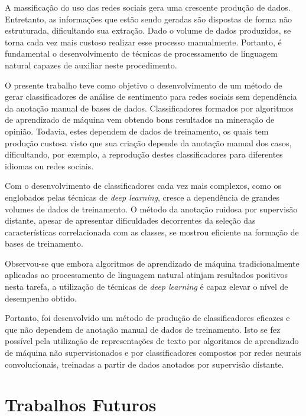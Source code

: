 A massificação do uso das redes sociais gera uma crescente produção de dados.
Entretanto, as informações que estão sendo geradas são dispostas de forma não estruturada, dificultando sua extração.
Dado o volume de dados produzidos, se torna cada vez mais custoso realizar esse processo manualmente.
Portanto, é fundamental o desenvolvimento de técnicas de processamento de linguagem natural capazes de auxiliar neste
procedimento.

O presente trabalho teve como objetivo o desenvolvimento de um método de gerar classificadores de análise de sentimento
para redes sociais sem dependência da anotação manual de bases de dados.
Classificadores formados por algoritmos de aprendizado de máquina vem obtendo bons resultados na mineração de opinião.
Todavia, estes dependem de dados de treinamento, os quais tem produção custosa visto que sua criação depende da anotação
manual dos casos, dificultando, por exemplo, a reprodução destes classificadores para diferentes idiomas ou redes
sociais.

Com o desenvolvimento de classificadores cada vez mais complexos, como os englobados pelas técnicas de
\textit{deep learning}, cresce a dependência de grandes volumes de dados de treinamento.
O método da anotação ruidosa por supervisão distante, apesar de apresentar dificuldades decorrentes da seleção das
características correlacionada com as classes, se mostrou eficiente na formação de bases de treinamento.

Observou-se que embora algoritmos de aprendizado de máquina tradicionalmente aplicadas ao processamento de linguagem
natural atinjam resultados positivos nesta tarefa, a utilização de técnicas de \textit{deep learning} é capaz elevar o
nível de desempenho obtido.

Portanto, foi desenvolvido um método de produção de classificadores eficazes e que não dependem de anotação manual de
dados de treinamento.
Isto se fez possível pela utilização de representações de texto por algoritmos de aprendizado de máquina não
supervisionados e por classificadores compostos por redes neurais convolucionais, treinadas a partir de dados anotados
por supervisão distante.

\section{Trabalhos Futuros}

